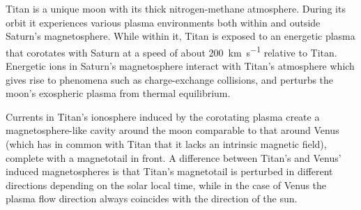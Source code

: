 \documentclass[12pt, parskip=full*, abstract]{scrartcl}
\begin{document}
Titan is a unique moon with its thick nitrogen-methane atmosphere. During its orbit it experiences various plasma environments both within and outside Saturn's magnetosphere. While within it, Titan is exposed to an energetic plasma that corotates with Saturn at a speed of about \SI{200}{\kilo\metre\per\second} relative to Titan. Energetic ions in Saturn's magnetosphere interact with Titan's atmosphere which gives rise to phenomena such as charge-exchange collisions, and perturbs the moon's exospheric plasma from thermal equilibrium. 

Currents in Titan's ionosphere induced by the corotating plasma create a magnetosphere-like cavity around the moon comparable to that around Venus (which has in common with Titan that it lacks an intrinsic magnetic field), complete with a magnetotail in front. A difference between Titan's and Venus' induced magnetospheres is that Titan's magnetotail is perturbed in different directions depending on the solar local time, while in the case of Venus the plasma flow direction always coincides with the direction of the sun. 


\newpage
\printbibliography
\end{document}
